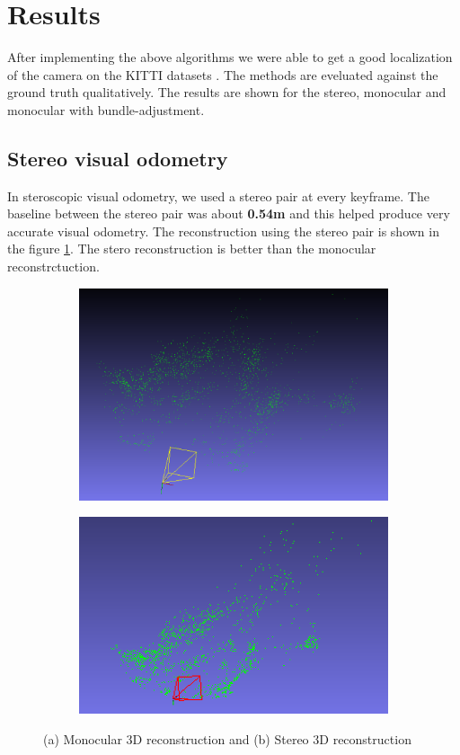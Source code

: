\documentclass{article}
\begin{document}
\section{Results}
After implementing the above algorithms we were able to get a good localization of the camera on the KITTI datasets \citep{kitti}. The methods are eveluated against the ground truth qualitatively. The results are shown for the stereo, monocular and monocular with bundle-adjustment.

\subsection{Stereo visual odometry}
In steroscopic visual odometry, we used a stereo pair at every keyframe. The baseline between the stereo pair was about \textbf{0.54m} and this helped produce very accurate visual odometry. The reconstruction using the stereo pair is shown in the figure \ref{fig:reconstruction}. The stero reconstruction is better than the monocular reconstrctuction.

\begin{figure}
\begin{subfigure}{0.5\textwidth}
\centering
\includegraphics[height=0.5\textwidth]{./mono_reconstruction}
\end{subfigure}
\begin{subfigure}{0.5\textwidth}
\centering
\includegraphics[height=0.5\textwidth]{./stereo_reconstruction}
\end{subfigure}
\caption{(a) Monocular 3D reconstruction and (b) Stereo 3D reconstruction}
\label{fig:reconstruction}
\end{figure}
\end{document}
